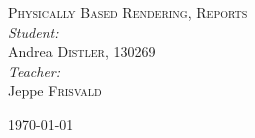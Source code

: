 \documentclass[a4paper]{article}
\begin{document}
\begin{titlepage}
\textsc{\LARGE Physically Based Rendering, Reports}\\[1.5cm]

\emph{Student:}\\
Andrea \textsc{Distler}, 130269\\[1.5cm]

\emph{Teacher:}\\
Jeppe \textsc{Frisvald}\\

\vfill

{\large \today}
\end{titlepage}

\tableofcontents
\newpage




\newpage


\newpage

\end{document}
